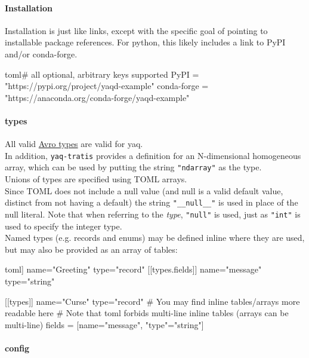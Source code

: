 \hypertarget{installation-1}{%
\paragraph{Installation}\label{installation-1}}

Installation is just like links, except with the specific goal of
pointing to installable package references. For python, this likely
includes a link to PyPI and/or conda-forge.

\begin{codefragment}{toml}\noop
[installation]  # all optional, arbitrary keys supported
PyPI = "https://pypi.org/project/yaqd-example"
conda-forge = "https://anaconda.org/conda-forge/yaqd-example"
\end{codefragment}

\hypertarget{types}{%
\paragraph{types}\label{types}}

All valid
\href{https://avro.apache.org/docs/current/spec.html\#schemas}{Avro
types} are valid for yaq.\\
In addition, \texttt{yaq-tratis} provides a definition for an
N-dimensional homogeneous array, which can be used by putting the string
\texttt{"ndarray"} as the type.\\
Unions of types are specified using TOML arrays.\\
Since TOML does not include a null value (and null is a valid default
value, distinct from not having a default) the string
\texttt{"\_\_null\_\_"} is used in place of the null literal. Note that
when referring to the \emph{type}, \texttt{"null"} is used, just as
\texttt{"int"} is used to specify the integer type.\\
Named types (e.g. records and enums) may be defined inline where they
are used, but may also be provided as an array of tables:

\begin{codefragment}{toml}\noop
[[types]]
name="Greeting"
type="record"
[[types.fields]]
name="message"
type="string"

[[types]]
name="Curse"
type="record"
# You may find inline tables/arrays more readable here
# Note that toml forbids multi-line inline tables (arrays can be multi-line)
fields = [{name="message", "type"="string"}]
\end{codefragment}

\hypertarget{config}{%
\paragraph{config}\label{config}}

